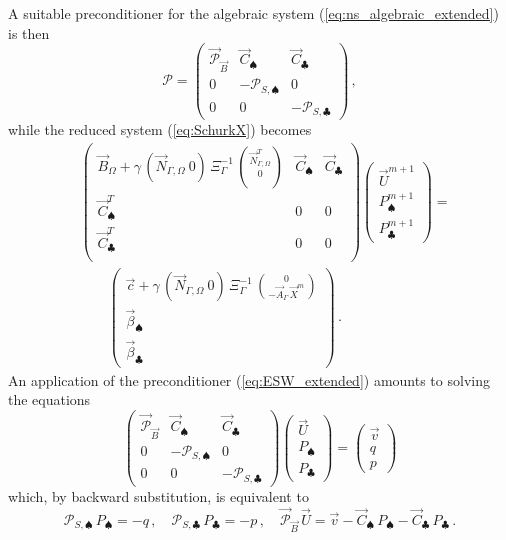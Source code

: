 \documentclass[a4paper,12pt,onecolumn]{article}
\newcommand{\NbulkT}{\vec{N}_{\Gamma,\Omega}^T}
\newcommand{\Nbulk}{\vec{N}_{\Gamma,\Omega}}
\begin{document}
A suitable preconditioner for the algebraic system
(\ref{eq:ns_algebraic_extended}) is then
\begin{equation} \label{eq:ESW_extended}
\mathcal{P} = \begin{pmatrix}
\vec{\mathcal{P}}_{\vec B} & \vec C_\spadesuit & \vec C_\clubsuit \\
0 & -\mathcal{P}_{S,\spadesuit} & 0 \\
0 & 0 &-\mathcal{P}_{S,\clubsuit}
\end{pmatrix}\,,
\end{equation}
while the reduced system (\ref{eq:SchurkX}) becomes
\begin{align}\label{eq:SchurkX_extended}
&
\begin{pmatrix}
\vec B_\Omega + \gamma\,(\Nbulk \ 0)\,\Xi_\Gamma^{-1}\,\binom{\NbulkT}{0} &
\vec C_\spadesuit & \vec C_\clubsuit \\
\vec C^T_\spadesuit & 0 & 0 \\
\vec C^T_\clubsuit & 0 & 0 \\
\end{pmatrix}
\begin{pmatrix}
\vec U^{m+1} \\
P^{m+1}_\spadesuit \\
P^{m+1}_\clubsuit
\end{pmatrix}
= \nonumber \\
& \qquad
\begin{pmatrix}
\vec c+\gamma\,(\Nbulk \ 0)\,
\Xi_\Gamma^{-1}\,\binom{0}{-\vec A_\Gamma\,\vec X^m} \\
\vec \beta_\spadesuit \\
\vec \beta_\clubsuit
\end{pmatrix}\,.
\end{align}
An application of the preconditioner (\ref{eq:ESW_extended}) amounts to solving
the equations
\begin{equation*}
\begin{pmatrix}
\vec{\mathcal{P}}_{\vec B} & \vec C_\spadesuit & \vec C_\clubsuit \\
0 & -\mathcal{P}_{S,\spadesuit} & 0 \\
0 & 0 &-\mathcal{P}_{S,\clubsuit}
\end{pmatrix}
\begin{pmatrix}
\vec U \\
P_\spadesuit \\
P_\clubsuit
\end{pmatrix}
=
\begin{pmatrix}
\vec v \\
q \\
p
\end{pmatrix}
\end{equation*}
which, by backward substitution, is equivalent to
\begin{equation}\label{eq:blocksolution_extended}
\mathcal{P}_{S,\spadesuit}\,P_\spadesuit =
-q\,,\quad \mathcal{P}_{S,\clubsuit}\,P_\clubsuit =
-p\,,\quad \vec{\mathcal{P}}_{\vec B}\,\vec U =
\vec v - \vec C_\spadesuit\,P_\spadesuit - \vec C_\clubsuit\,P_\clubsuit\,.
\end{equation}
\end{document}
